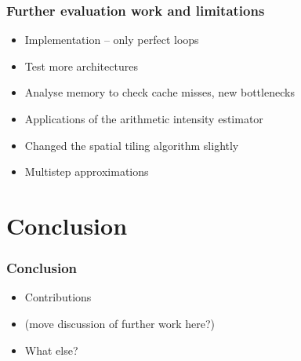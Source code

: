 \documentclass{beamer}
\begin{document}
\begin{frame}
\frametitle{Further evaluation work and limitations}

\begin{itemize}
	\item Implementation -- only perfect loops
	\item Test more architectures
	\item Analyse memory to check cache misses, new bottlenecks
	\item Applications of the arithmetic intensity estimator
	\item Changed the spatial tiling algorithm slightly
	\item Multistep approximations
\end{itemize}
\end{frame}



\section{Conclusion}

\begin{frame}
\frametitle{Conclusion}

\begin{itemize}
	\item Contributions
	\item (move discussion of further work here?)
	\item What else?
\end{itemize}
\end{frame}



%
\end{document}
